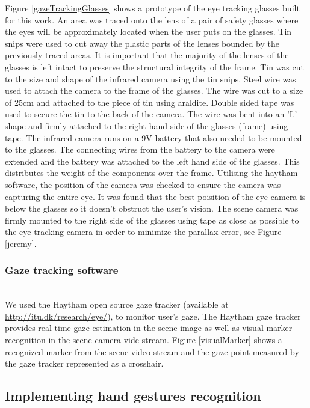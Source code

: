 \documentclass[jou,a4paper,notxfonts]{apa}
\begin{document}
Figure \ref{gazeTrackingGlasses} shows a prototype of the eye tracking glasses built for this work. An area was traced onto the lens of a pair of safety glasses where the eyes will be approximately located when the user puts on the glasses. Tin snips were used to cut away the plastic parts of the lenses bounded by the previously traced areas. It is important that the majority of the lenses of the glasses is left intact to preserve the structural integrity of the frame. Tin was cut to the size and shape of the infrared camera using the tin snips. Steel wire was used to attach the camera to the frame of the glasses. The wire was cut to a size of 25cm and attached to the piece of tin using araldite. Double sided tape was used to secure the tin to the back of the camera. The wire was bent into an 'L' shape and firmly attached to the right hand side of the glasses (frame) using tape. The infrared camera runs on a 9V battery that also needed to be mounted to the glasses. The connecting wires from the battery to the camera were extended and the battery was attached to the left hand side of the glasses. This distributes the weight of the components over the frame. Utilising the haytham software, the position of the camera was checked to ensure the camera was capturing the entire eye. It was found that the best poisition of the eye camera is below the glasses so it doesn't obstruct the user's vision. The scene camera was firmly mounted to the right side of the glasses using tape as close as possible to the eye tracking camera in order to minimize the parallax error, see Figure \ref{jeremy}.

\subsubsection{Gaze tracking software}\hspace{0pt} \\
We used the Haytham open source gaze tracker (available at \url{http://itu.dk/research/eye/}), to monitor user's gaze. The Haytham gaze tracker provides real-time gaze estimation in the scene image as well as visual marker recognition in the scene camera vide stream. Figure \ref{visualMarker} shows a recognized marker from the scene video stream and the gaze point measured by the gaze tracker represented as a crosshair. 

\subsection{Implementing hand gestures recognition}
\end{document}
